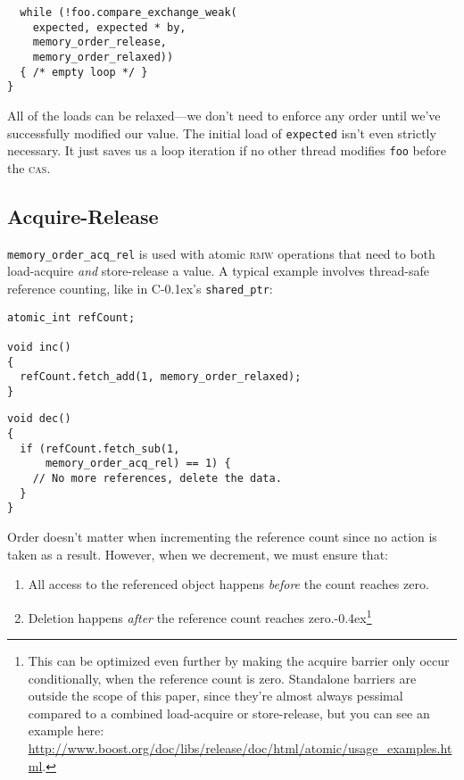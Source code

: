 \documentclass[fontsize=\bodyfontsize, numbers=endperiod]{scrartcl}
\newcommand{\codesize}{\fontsize{\bodyfontsize}{\bodybaselineskip}}
\newcommand{\punckern}{\kern-0.4ex}
\newcommand{\cpp}[1]{C\kern-0.1ex\raisebox{0.15ex}{\texttt{++}}{\addfontfeature{Numbers=LowercaseOff}#1}}
\newenvironment{colfigure}
  {\par\vspace{1\baselineskip minus 0.5\baselineskip}\noindent\minipage{\linewidth}}
  {\endminipage\vspace{1\baselineskip minus 0.7\baselineskip}}
\begin{document}
\begin{multicols}{2}
\begin{colfigure}
\begin{verbatim}
  while (!foo.compare_exchange_weak(
    expected, expected * by,
    memory_order_release,
    memory_order_relaxed))
  { /* empty loop */ }
}
\end{verbatim}
\end{colfigure}
All of the loads can be relaxed---we don't need to enforce any order
until we've successfully modified our value.
The initial load of \texttt{expected} isn't even strictly necessary.
It just saves us a loop iteration if no other thread modifies
\texttt{foo} before the \textsc{cas}.

\subsection{Acquire-Release}

\texttt{memory\_order\_acq\_rel} is used with atomic \textsc{rmw} operations
that need to both load-acquire \emph{and} store-release a value.
A typical example involves thread-safe reference counting,
like in \cpp{}'s \texttt{shared_ptr}:
\begin{colfigure}
\begin{verbatim}
atomic_int refCount;

void inc()
{
  refCount.fetch_add(1, memory_order_relaxed);
}
\end{verbatim}
\end{colfigure}
\begin{colfigure}
\begin{verbatim}
void dec()
{
  if (refCount.fetch_sub(1,
      memory_order_acq_rel) == 1) {
    // No more references, delete the data.
  }
}
\end{verbatim}
\end{colfigure}

Order doesn't matter when incrementing the reference
count since no action is taken as a result.
However, when we decrement, we must ensure that:
\begin{enumerate}
\item All access to the referenced object happens
\emph{before} the count reaches zero.
\item Deletion happens \emph{after} the reference count reaches
    zero.\punckern\footnote{This can be optimized even further by
    making the acquire barrier only occur conditionally, when the reference
    count is zero.
    Standalone barriers are outside the scope of this paper,
    since they're almost always pessimal compared to a combined load-acquire
    or store-release, but you can see an example here:
    \url{http://www.boost.org/doc/libs/release/doc/html/atomic/usage\_examples.html}.}
\end{enumerate}


\end{multicols}
\end{document}
